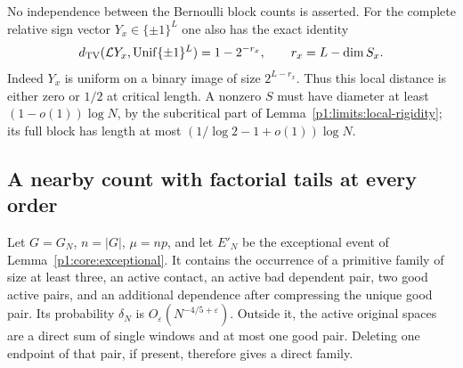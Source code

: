 No independence between the Bernoulli block counts is asserted.
For the complete relative sign vector $Y_x\in\{\pm1\}^L$ one
also has the exact identity
\[
 d_{\mathrm{TV}}(\mathcal L Y_x,\mathrm{Unif}\{\pm1\}^L)=1-2^{-r_x},
 \qquad r_x=L-\dim S_x.
\]
Indeed $Y_x$ is uniform on a binary image of size $2^{L-r_x}$.
Thus this local distance is either zero or $1/2$ at critical
length.  A nonzero $S$ must have diameter at least
$(1-o(1))\log N$, by the subcritical part of Lemma~\ref{p1:limits:local-rigidity};
its full block has length at most
$(1/\log2-1+o(1))\log N$.

\subsection{A nearby count with factorial tails at every order}

Let $G=G_N$, $n=|G|$, $\mu=np$, and let $E'_N$ be the exceptional
event of Lemma~\ref{p1:core:exceptional}.  It contains the
occurrence of a primitive family of size at least three, an active
contact, an active bad dependent pair, two good active pairs, and
an additional dependence after compressing the unique good pair.
Its probability $\delta_N$ is $O_\varepsilon(N^{-4/5+\varepsilon})$.
Outside it, the active original spaces are a direct sum of single
windows and at most one good pair.  Deleting one endpoint of that
pair, if present, therefore gives a direct family.

